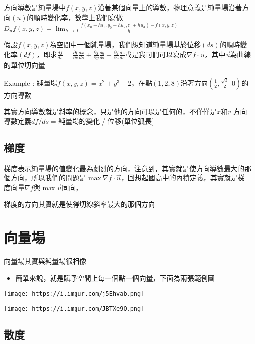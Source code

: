 \documentclass[
]{book}
\providecommand{\tightlist}{%
  \setlength{\itemsep}{0pt}\setlength{\parskip}{0pt}}
\begin{document}
方向導數是純量場中\(f(x,y,z)\)沿著某個向量上的導數，物理意義是純量場沿著方向\((u)\)的順時變化率，數學上我們寫做\(D_uf(x,y,z) = \displaystyle\lim_{h \to 0}\frac{f(x_0+hu_1,y_0+hu_2,z_0 + hu_3) - f(x,y,z)}{h}\)

假設\(f(x,y,z)\)為空間中一個純量場，我們想知道純量場基於位移\((ds)\)的順時變化率\((df)\)，即求\(\frac{df}{ds} = \frac{\partial f}{\partial x}\frac{dx}{ds} + \frac{\partial f}{\partial y}\frac{dy}{ds} + \frac{\partial f}{\partial z}\frac{dz}{ds}\)或是我可們可以寫成\(\nabla f \cdot \vec u\)，其中\(\vec u\)為曲線的單位切向量

Example : 純量場\(f(x,y,z)=x^2+y^3-2\)，在點\((1,2,8)\)沿著方向\((\frac{1}{2},\frac{\sqrt{3}}{2},0)\)的方向導數

其實方向導數就是斜率的概念，只是他的方向可以是任何的，不僅僅是\(x\)和\(y\)
方向導數定義\(df/ds\) = 純量場的變化 / 位移(單位弧長)

\hypertarget{ux68afux5ea6}{%
\subsection{梯度}\label{ux68afux5ea6}}

梯度表示純量場的值變化最為劇烈的方向，注意到，其實就是使方向導數最大的那個方向，所以我們的問題是\(\max{\nabla f\cdot \vec u}\)，回想起國高中的內積定義，其實就是梯度向量\(\nabla f\)與\(\max\vec u\)同向，

梯度的方向其實就是使得切線斜率最大的那個方向

\hypertarget{ux5411ux91cfux5834}{%
\section{向量場}\label{ux5411ux91cfux5834}}

向量場其實與純量場很相像

\begin{itemize}
\tightlist
\item
  簡單來說，就是賦予空間上每一個點一個向量，下面為兩張範例圖
\end{itemize}

\texttt{[image: https://i.imgur.com/j5Ehvab.png]}

\texttt{[image: https://i.imgur.com/JBTXe9O.png]}

\hypertarget{ux6563ux5ea6}{%
\subsection{散度}\label{ux6563ux5ea6}}
\end{document}
